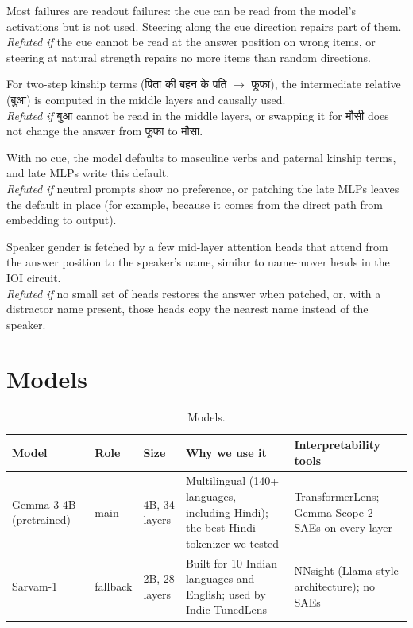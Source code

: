 \documentclass[11pt,a4paper]{article}
\newcommand{\hi}[1]{{\devfont #1}}
\newcommand{\refuted}[1]{\\{\small\textcolor{muted}{\emph{Refuted if} #1}}}
\begin{document}
\begin{description}[leftmargin=0pt,itemsep=0.35em]
  \item[H1 (readout failures).] Most failures are readout failures: the cue can be read from the model's activations but is not used. Steering along the cue direction repairs part of them.
  \refuted{the cue cannot be read at the answer position on wrong items, or steering at natural strength repairs no more items than random directions.}
  \item[H2 (two-step kinship).] For two-step kinship terms (\hi{पिता की बहन के पति} $\to$ \hi{फूफा}), the intermediate relative (\hi{बुआ}) is computed in the middle layers and causally used.
  \refuted{\hi{बुआ} cannot be read in the middle layers, or swapping it for \hi{मौसी} does not change the answer from \hi{फूफा} to \hi{मौसा}.}
  \item[H3 (defaults).] With no cue, the model defaults to masculine verbs and paternal kinship terms, and late MLPs write this default.
  \refuted{neutral prompts show no preference, or patching the late MLPs leaves the default in place (for example, because it comes from the direct path from embedding to output).}
  \item[H4 (speaker heads).] Speaker gender is fetched by a few mid-layer attention heads that attend from the answer position to the speaker's name, similar to name-mover heads in the IOI circuit.
  \refuted{no small set of heads restores the answer when patched, or, with a distractor name present, those heads copy the nearest name instead of the speaker.}
\end{description}

\section{Models}

\begin{table}[H]
\centering
\small
\begin{tabularx}{\textwidth}{@{}l l l Y Y@{}}
\toprule
\textbf{Model} & \textbf{Role} & \textbf{Size} & \textbf{Why we use it} & \textbf{Interpretability tools} \\
\midrule
Gemma-3-4B (pretrained)~\cite{gemma3} & main & 4B, 34 layers & Multilingual (140+ languages, including Hindi); the best Hindi tokenizer we tested & TransformerLens; Gemma Scope 2 SAEs on every layer~\cite{gemmascope2} \\[2pt]
Sarvam-1~\cite{sarvam1} & fallback & 2B, 28 layers & Built for 10 Indian languages and English; used by Indic-TunedLens & NNsight (Llama-style architecture); no SAEs \\
\bottomrule
\end{tabularx}
\caption{Models.}
\label{tab:models}
\end{table}
\end{document}
